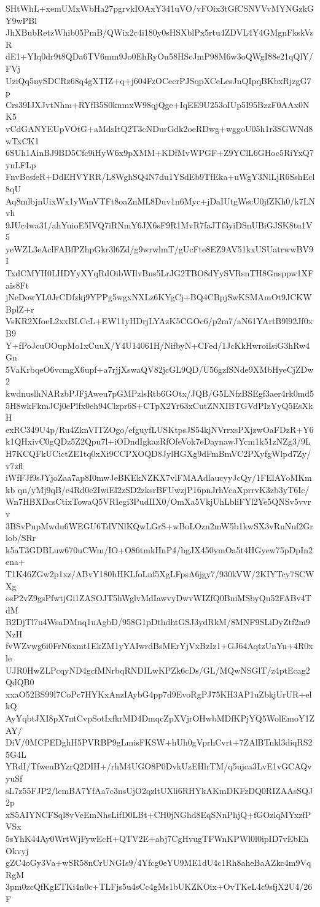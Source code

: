 SHtWhL+xemUMxWbHa27pgrvkIOAxY341uVO/vFOix3tGfCSNVVvMYNGzkGY9wPBl
JhXBubRetzWhib05PmB/QWix2c4i180y0sHSXblPx5rtu4ZDVL4Y4GMgnFkskVsR
dE1+YIq0dr9t8QDa6TV6mm9Jo0EhRyOu58HScJmP98M6w3oQWgI88e21qQlY/FVj
UziQq5nySDCRz68q4gXTIZ+q+j604FzOCecrPJSqpXCeLesJnQIpqBKbxRjzgG7p
Crs39IJXJvtNhm+RYfB5S0knmxW98qjQge+IqEE9U253oIUp5I95BzzF0AAx0NK5
vCdGANYEUpVOtG+aMdsItQ2T3cNDurGdk2oeRDwg+wggoU05h1r3SGWNd8wTxCK1
6SUh1AinBJ9BD5Cfc9iHyW6x9pXMM+KDfMvWPGF+Z9YClL6GHoc5RiYxQ7ynLFLp
FnvBcsfeR+DdEHVYRR/L8WghSQ4N7du1YSdEb9TfEka+uWgY3NlLjR6SshEcl8qU
Aq8mlbjnUixWx1yWmVTFt8oaZnML8Duv1n6Myc+jDaIUtgWscU0jfZKh0/k7LNvh
9JUc4wa31/ahYuioE5IVQ7iRNmY6JX6sF9R1MvR7faJTf3yiDSnUBiGJSK8tu1V5
yeWZL3eAclFABfPZhpGkr3l6Zd/g9wrwlmT/gUcFte8EZ9AV51kxUSUatrwwBV9I
TxdCMYH0LHDYyXYqRdOibWIlvBus5LrJG2TBO8dYySVRsnTH8Gnsppw1XFais8Ft
jNeDowYL0JrCDfzkj9YPPg5wgxNXLz6KYgCj+BQ4CBpjSwKSMAmOt9JCKWBplZ+r
VsKR2XfoeL2xxBLCcL+EW11yHDrjLYAzK5CGOc6/p2m7/aN61YArtB9l92Jf0xB9
Y+fPoJcuOOupMo1xCuuX/Y4U14061H/NifbyN+CFed/1JcKkHwroiIsiG3hRw4Gn
5VaKrbqeO6vcmgX6upf+a7rjjXswaQV82jcGL9QD/U56gzfSNde9XMbHyeCjZDw2
kwdnuslhNARzbPJFjAweu7pGMPzlsRtb6GOtx/JQB/G5LNfzBSEgf3aer4rk0md5
5H8wkFkmJCj0ePlfx0eh94Clzpr6S+CTpX2Yr63xCutZNXIBTGVdPIzYyQ5EsXkH
exRC349U4p/Ru4ZknVITZOgo/efguyfLUSKtpsJS54kjNVrrxsPXjzwOaFDzR+Y6
k1QHxivC0gQDz5Z2Qpu7l+iODndIgkazRfOfeVok7eDaynawJYcm1k51zNZg3/9L
H7KCQFkUCictZE1tq0xXi9CCPXOQD8JylHGXg9dFmBmVC2PXyfgWlpd7Zy/v7zfl
iWfFJf9sJYjoZaa7ap8I0mwJeBKEkNZKX7vlFMAAdlaucyyJcQy/1FElAYoMKmkb
qn/yMj9qB/e4Rd0e2IwiEl2zSD2zksrBFUwzjP16pnJrhVcaXprrvK3zb3yT6Ic/
Wn7HBXDcsCtixTowaQ5VRIegi3PudIIX0/OmXa5VkjUhLbliFYl2Ye5QNSv5vvrv
3BSvPupMwdu6WEGU6TdVNlKQwLGrS+wBoLOzn2mW5b1kwSX3vRnNuf2Grlob/SRr
k5aT3GDBLuw670uCWm/IO+O86tmkHnP4/bgJX450ymOa5t4HGyew75pDpIn2ena+
T1K46ZGw2p1xz/ABvY180hHKLfoLnf5XgLFpsA6jgy7/930kVW/2KIYTcy7SCWXg
osP2vZ9gsPfwtjGi1ZASOJT5hWglvMdIawvyDwvWIZfQ0BniMSbyQu52FABv4TdM
B2DjTl7u4WsaDMnq1uAgbD/958G1pDthdhtGSJ3ydRkM/8MNF9SLiDyZtf2m9NzH
fvWZvwg6i0FrN6xmt1EkZM1yYAIwrdBsMErYjVxBzIz1+GJ64AqtzUnYu+4R0xle
UJR0HwZLPcqyND4gcfMNrbqRNDILwKPZk6cDs/GL/MQwNSGlT/z4ptEcag2QdQB0
xxaO52BS99l7CoPc7HYKxAnzIAybG4pp7d9EvoRgPJ75KH3AP1uZbkjUrUR+elkQ
AyYqbtJXI8pX7ntCvpSotIxfkrMD4DmqcZpXVjrOHwbMDfKPjYQ5WolEmoY1ZAY/
DiV/0MCPEDghH5PVRBP9gLmisFKSW+hUh0gVprhCvrt+7ZAlBTnkl3diqRS25G4L
YRdI/TfweuBYzrQ2DIH+/rhM4UGO8P0DvkUzEHlrTM/q5ujca3LvE1vGCAQvyuSf
sL7z55FJP2/lcmBA7YfAa7c3nsUjO2qzltUXli6RHYkAKmDKFzDQ0RIZAAsSQJ2p
xS5AIYNCFSql8vVeEmNhsLifD0LBt+CH0jNGhd8EqSNnPhjQ+fGOzlqMYxzfPVSx
5sYhK44Ay0WrtWjFywEcH+QTV2E+abj7CgHvugTFWnKPWl0l0ipID7vEbEhOkvyj
gZC4oGy3Va+wSR58nCrUNGIs9/4Yfcg0eYU9ME1dU4c1Rh8aheBaAZkc4m9VqRgM
3pm0zcQfKgETKi4n0c+TLFjs5u4sCc4gMs1bUKZKOix+OvTKeL4c9sfjX2U4/26F
